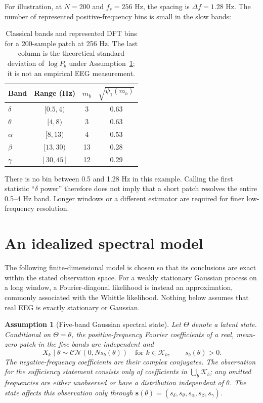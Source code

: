 \documentclass[11pt,a4paper]{article}
\newtheorem{assumption}{Assumption}
\newcommand{\CN}{\mathcal{CN}}
\begin{document}
For illustration, at $N=200$ and $f_s=256$ Hz, the spacing is $\Delta f=1.28$ Hz.
The number of represented positive-frequency bins is small in the slow bands:
\begin{table}[h]
\centering
\caption{Classical bands and represented DFT bins for a 200-sample patch at 256 Hz.
The last column is the theoretical standard deviation of $\log P_b$ under
Assumption~\ref{as:spectral}; it is not an empirical EEG measurement.}
\label{tab:bins}
\begin{tabular}{lccc}
\toprule
Band & Range (Hz) & $m_b$ & $\sqrt{\psi_1(m_b)}$ \\
\midrule
$\delta$ & $[0.5,4)$ & 3 & 0.63 \\
$\theta$ & $[4,8)$ & 3 & 0.63 \\
$\alpha$ & $[8,13)$ & 4 & 0.53 \\
$\beta$ & $[13,30)$ & 13 & 0.28 \\
$\gamma$ & $[30,45]$ & 12 & 0.29 \\
\bottomrule
\end{tabular}
\end{table}
There is no bin between 0.5 and 1.28 Hz in this example. Calling the first statistic
``$\delta$ power'' therefore does not imply that a short patch resolves the entire
0.5--4 Hz band. Longer windows or a different estimator are required for finer
low-frequency resolution.

\section{An idealized spectral model}

The following finite-dimensional model is chosen so that its conclusions are exact
within the stated observation space. For a weakly stationary Gaussian process on a
long window, a Fourier-diagonal likelihood is instead an approximation, commonly
associated with the Whittle likelihood. Nothing below assumes that real EEG is
exactly stationary or Gaussian.

\begin{assumption}[Five-band Gaussian spectral state]\label{as:spectral}
Let $\Theta$ denote a latent state. Conditional on $\Theta=\theta$, the positive-frequency
Fourier coefficients of a real, mean-zero patch in the five bands are independent and
\begin{equation}
X_k\mid\theta\sim\CN\!\left(0,Ns_b(\theta)\right)
\quad\text{for }k\in\mathcal K_b,\qquad s_b(\theta)>0.
\label{eq:complexnormal}
\end{equation}
The negative-frequency coefficients are their complex conjugates. The observation for
the sufficiency statement consists only of coefficients in
$\bigcup_b\mathcal K_b$; any omitted frequencies are either unobserved or have a
distribution independent of $\theta$. The state affects this observation only through
$\bm s(\theta)=(s_{\delta},s_{\theta},s_{\alpha},s_{\beta},s_{\gamma})$.
\end{assumption}
\end{document}
